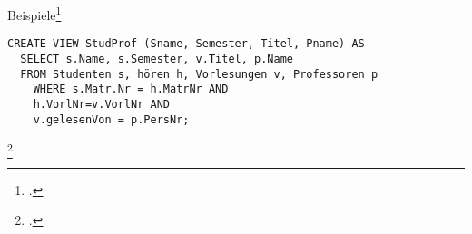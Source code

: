 \documentclass{lehramt-informatik-haupt}
\begin{document}
Beispiele\footcite[Seite 140]{kemper}

\begin{verbatim}
CREATE VIEW StudProf (Sname, Semester, Titel, Pname) AS
  SELECT s.Name, s.Semester, v.Titel, p.Name
  FROM Studenten s, hören h, Vorlesungen v, Professoren p
    WHERE s.Matr.Nr = h.MatrNr AND
    h.VorlNr=v.VorlNr AND
    v.gelesenVon = p.PersNr;
\end{verbatim}
\footcite[Seite 11]{db:fs:3}
\literatur
\end{document}
